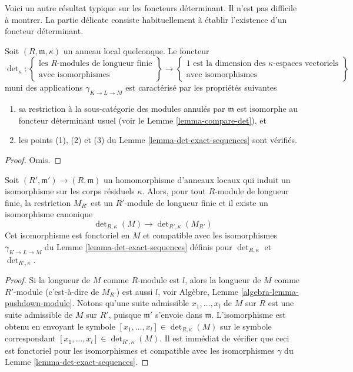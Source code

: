 \medskip\noindent
Voici un autre résultat typique sur les foncteurs déterminant.
Il n'est pas difficile à montrer. La partie délicate consiste habituellement à établir
l'existence d'un foncteur déterminant.

\begin{lemma}
\label{lemma-uniqueness-det}
Soit $(R, \mathfrak m, \kappa)$ un anneau local quelconque.
Le foncteur
$$
\det\nolimits_\kappa :
\left\{
\begin{matrix}
\text{les }R\text{-modules de longueur finie} \\
\text{avec isomorphismes}
\end{matrix}
\right\}
\longrightarrow
\left\{
\begin{matrix}
1\text{ est la dimension des }\kappa\text{-espaces vectoriels} \\
\text{avec isomorphismes}
\end{matrix}
\right\}
$$
muni des applications $\gamma_{K \to L \to M}$ est caractérisé par
les propriétés suivantes
\begin{enumerate}
\item sa restriction à la sous-catégorie des modules annulés
par $\mathfrak m$ est isomorphe au foncteur déterminant usuel
(voir le Lemme \ref{lemma-compare-det}), et
\item les points (1), (2) et (3) du Lemme \ref{lemma-det-exact-sequences}
sont vérifiés.
\end{enumerate}
\end{lemma}

\begin{proof}
Omis.
\end{proof}

\begin{lemma}
\label{lemma-determinant-quotient-ring}
Soit $(R', \mathfrak m') \to (R, \mathfrak m)$ un homomorphisme d'anneaux
locaux qui induit un isomorphisme sur les corps résiduels $\kappa$.
Alors, pour tout $R$-module de longueur finie, la restriction $M_{R'}$
est un $R'$-module de longueur finie et il existe un isomorphisme canonique
$$
\det\nolimits_{R, \kappa}(M)
\longrightarrow
\det\nolimits_{R', \kappa}(M_{R'})
$$
Cet isomorphisme est fonctoriel en $M$ et compatible avec les
isomorphismes $\gamma_{K \to L \to M}$ du Lemme \ref{lemma-det-exact-sequences}
définis pour $\det_{R, \kappa}$ et $\det_{R', \kappa}$.
\end{lemma}

\begin{proof}
Si la longueur de $M$ comme $R$-module est $l$, alors la longueur
de $M$ comme $R'$-module (c'est-à-dire de $M_{R'}$) est aussi $l$, voir
Algèbre, Lemme \ref{algebra-lemma-pushdown-module}.
Notons qu'une suite admissible $x_1, \ldots, x_l$ de $M$
sur $R$ est une suite admissible de $M$ sur $R'$, puisque $\mathfrak m'$
s'envoie dans $\mathfrak m$.
L'isomorphisme est obtenu en envoyant le symbole
$[x_1, \ldots, x_l] \in \det\nolimits_{R, \kappa}(M)$
sur le symbole correspondant
$[x_1, \ldots, x_l] \in \det\nolimits_{R', \kappa}(M)$.
Il est immédiat de vérifier que ceci est fonctoriel pour les
isomorphismes et compatible avec les isomorphismes
$\gamma$ du Lemme \ref{lemma-det-exact-sequences}.
\end{proof}

